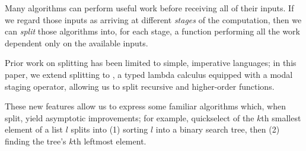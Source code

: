 Many algorithms can perform useful work before receiving all of their inputs.
If we regard those inputs as arriving at different \emph{stages} of the
computation, then we can \emph{split} those algorithms into, for each stage, a
function performing all the work dependent only on the available inputs.

Prior work on splitting has been limited to simple, imperative languages; in
this paper, we extend splitting to \lang, a typed lambda calculus equipped with
a modal staging operator, allowing us to split recursive and higher-order
functions.

These new features allow us to express some familiar algorithms which, when
split, yield asymptotic improvements; for example, quickselect of the $k$th
smallest element of a list $l$ splits into (1) sorting $l$ into a binary search
tree, then (2) finding the tree's $k$th leftmost element.

